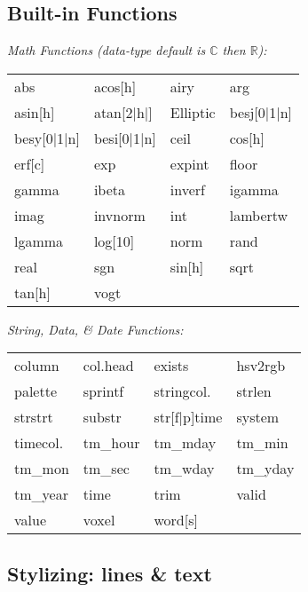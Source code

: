 

\subsection*{Built-in Functions}

\textit{Math Functions (data-type default is $\mathbb{C}$ then $\mathbb{R}$):}\\
{\footnotesize
\begin{tabular}{l l l l}
    abs         & acos[h]       & airy      & arg       \\
    asin[h]     & atan[2|h|]    & Elliptic  & besj[0|1|n]       \\
    besy[0|1|n] & besi[0|1|n]   & ceil      & cos[h]    \\
    erf[c]      & exp           & expint    & floor     \\
    gamma       & ibeta         & inverf    & igamma    \\
    imag        & invnorm       & int       & lambertw  \\
    lgamma      & log[10]       & norm      & rand      \\
    real        & sgn           & sin[h]    & sqrt      \\
    tan[h]      & vogt
\end{tabular}}\vspace{2mm}

\textit{String, Data, \& Date Functions:}\\
{\footnotesize
\begin{tabular}{l l l l}
    column          & col.head      & exists        & hsv2rgb       \\
    palette         & sprintf       & stringcol.    & strlen        \\
    strstrt         & substr        & str[f|p]time  & system        \\
    timecol.        & tm\_hour      & tm\_mday      & tm\_min       \\
    tm\_mon         & tm\_sec       & tm\_wday      & tm\_yday      \\
    tm\_year        & time          & trim          & valid         \\
    value           & voxel         & word[s]       \\
\end{tabular}}


\subsection*{Stylizing: lines \& text}


